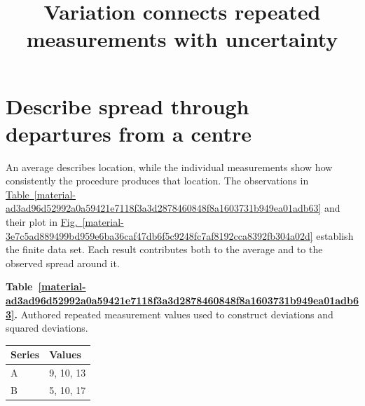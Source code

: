 \documentclass[11pt,a4paper]{article}
\newcounter{scripttable}
\begin{document}
\title{Variation connects repeated measurements with uncertainty}
\author{}
\date{}
\maketitle
\tableofcontents
\clearpage
\section{Describe spread through departures from a centre}
An average describes location, while the individual measurements show how consistently the procedure produces that location. The observations in \hyperref[material-ad3ad96d52992a0a59421e7118f3a3d2878460848f8a1603731b949ea01adb63]{Table~\ref*{material-ad3ad96d52992a0a59421e7118f3a3d2878460848f8a1603731b949ea01adb63}} and their plot in \hyperref[material-3e7c5ad889499bd959e6ba36caf47db6f5c9248fc7af8192cca8392fb304a02d]{Fig.~\ref*{material-3e7c5ad889499bd959e6ba36caf47db6f5c9248fc7af8192cca8392fb304a02d}} establish the finite data set. Each result contributes both to the average and to the observed spread around it.


\par\medskip
{}
\label{material-ad3ad96d52992a0a59421e7118f3a3d2878460848f8a1603731b949ea01adb63}
\noindent\textbf{Table~\ref*{material-ad3ad96d52992a0a59421e7118f3a3d2878460848f8a1603731b949ea01adb63}.} Authored repeated measurement values used to construct deviations and squared deviations.\par\nopagebreak
\begin{longtable}{@{}p{}p{}@{}}
Series & Values \\ \hline
\endhead
A & 9, 10, 13 \\ \hline
B & 5, 10, 17 \\ \hline
\end{longtable}
\medskip
\end{document}
